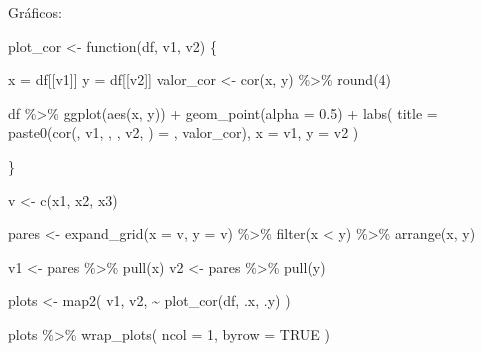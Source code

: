 \documentclass[
  letterpaper,
  DIV=11,
  numbers=noendperiod]{scrreprt}
\newenvironment{Shaded}{\begin{snugshade}}{\end{snugshade}}
\newcommand{\AttributeTok}[1]{\textcolor[rgb]{0.40,0.45,0.13}{#1}}
\newcommand{\ConstantTok}[1]{\textcolor[rgb]{0.56,0.35,0.01}{#1}}
\newcommand{\ControlFlowTok}[1]{\textcolor[rgb]{0.00,0.23,0.31}{#1}}
\newcommand{\DecValTok}[1]{\textcolor[rgb]{0.68,0.00,0.00}{#1}}
\newcommand{\FloatTok}[1]{\textcolor[rgb]{0.68,0.00,0.00}{#1}}
\newcommand{\FunctionTok}[1]{\textcolor[rgb]{0.28,0.35,0.67}{#1}}
\newcommand{\NormalTok}[1]{\textcolor[rgb]{0.00,0.23,0.31}{#1}}
\newcommand{\OtherTok}[1]{\textcolor[rgb]{0.00,0.23,0.31}{#1}}
\newcommand{\SpecialCharTok}[1]{\textcolor[rgb]{0.37,0.37,0.37}{#1}}
\newcommand{\StringTok}[1]{\textcolor[rgb]{0.13,0.47,0.30}{#1}}
\begin{document}
Gráficos:

\begin{Shaded}
\begin{Highlighting}[]
\NormalTok{plot\_cor }\OtherTok{\textless{}{-}} \ControlFlowTok{function}\NormalTok{(df, v1, v2) \{}
  
\NormalTok{  x }\OtherTok{=}\NormalTok{ df[[v1]]}
\NormalTok{  y }\OtherTok{=}\NormalTok{ df[[v2]]}
\NormalTok{  valor\_cor }\OtherTok{\textless{}{-}} \FunctionTok{cor}\NormalTok{(x, y) }\SpecialCharTok{\%\textgreater{}\%} \FunctionTok{round}\NormalTok{(}\DecValTok{4}\NormalTok{)}
  
\NormalTok{  df }\SpecialCharTok{\%\textgreater{}\%} \FunctionTok{ggplot}\NormalTok{(}\FunctionTok{aes}\NormalTok{(x, y)) }\SpecialCharTok{+}
    \FunctionTok{geom\_point}\NormalTok{(}\AttributeTok{alpha =} \FloatTok{0.5}\NormalTok{) }\SpecialCharTok{+}
    \FunctionTok{labs}\NormalTok{(}
      \AttributeTok{title =} \FunctionTok{paste0}\NormalTok{(}\StringTok{\textquotesingle{}cor(\textquotesingle{}}\NormalTok{, v1, }\StringTok{\textquotesingle{}, \textquotesingle{}}\NormalTok{, v2, }\StringTok{\textquotesingle{}) = \textquotesingle{}}\NormalTok{, valor\_cor),}
      \AttributeTok{x =}\NormalTok{ v1,}
      \AttributeTok{y =}\NormalTok{ v2}
\NormalTok{    )}
  
\NormalTok{\}}
\end{Highlighting}
\end{Shaded}

\begin{Shaded}
\begin{Highlighting}[]
\NormalTok{v }\OtherTok{\textless{}{-}} \FunctionTok{c}\NormalTok{(}\StringTok{\textquotesingle{}x1\textquotesingle{}}\NormalTok{, }\StringTok{\textquotesingle{}x2\textquotesingle{}}\NormalTok{, }\StringTok{\textquotesingle{}x3\textquotesingle{}}\NormalTok{)}

\NormalTok{pares }\OtherTok{\textless{}{-}} \FunctionTok{expand\_grid}\NormalTok{(}\AttributeTok{x =}\NormalTok{ v, }\AttributeTok{y =}\NormalTok{ v) }\SpecialCharTok{\%\textgreater{}\%} 
  \FunctionTok{filter}\NormalTok{(x }\SpecialCharTok{\textless{}}\NormalTok{ y) }\SpecialCharTok{\%\textgreater{}\%} 
  \FunctionTok{arrange}\NormalTok{(x, y)}

\NormalTok{v1 }\OtherTok{\textless{}{-}}\NormalTok{ pares }\SpecialCharTok{\%\textgreater{}\%} \FunctionTok{pull}\NormalTok{(x)}
\NormalTok{v2 }\OtherTok{\textless{}{-}}\NormalTok{ pares }\SpecialCharTok{\%\textgreater{}\%} \FunctionTok{pull}\NormalTok{(y)}

\NormalTok{plots }\OtherTok{\textless{}{-}} \FunctionTok{map2}\NormalTok{(}
\NormalTok{  v1, v2, }\SpecialCharTok{\textasciitilde{}} \FunctionTok{plot\_cor}\NormalTok{(df, .x, .y)}
\NormalTok{)}

\NormalTok{plots }\SpecialCharTok{\%\textgreater{}\%} 
  \FunctionTok{wrap\_plots}\NormalTok{(}
    \AttributeTok{ncol =} \DecValTok{1}\NormalTok{,}
    \AttributeTok{byrow =} \ConstantTok{TRUE}
\NormalTok{  )}
\end{Highlighting}
\end{Shaded}
\end{document}
